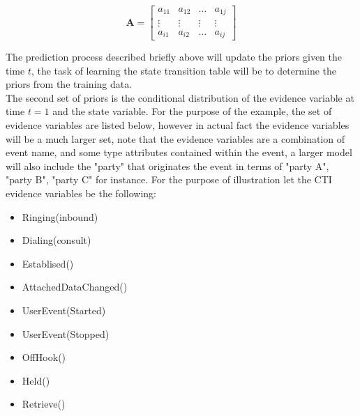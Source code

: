 \documentclass[11pt]{article}
\begin{document}
\begin{equation*}
    \mathbf{A} = \left[
    \begin{array}{cccc}
    a_{11} & a_{12} & \ldots & a_{1j} \\
    \vdots & \vdots & \vdots & \vdots \\
    a_{i1} & a_{i2} & \ldots & a_{ij}
   
    \end{array}
    \right]
\end{equation*}


The prediction process described briefly above will update the priors given the time $t$, the task of learning the state transition table will be to determine the priors from the training data.\\
The second set of priors is the conditional distribution of the  evidence variable at time $t=1$ and the state variable. For the purpose of the example, the set of evidence variables are listed below, however in actual fact the evidence variables will be a much larger set, note that the evidence variables are a combination of event name, and some type attributes contained within the event, a larger model will also include the "party" that originates the event in terms of "party A", "party B", "party C" for instance. For the purpose of illustration let the CTI evidence variables be the following:
\\
\begin{itemize}
\item Ringing(inbound)
\item Dialing(consult)
\item Establised()
\item AttachedDataChanged()
\item UserEvent(Started)
\item UserEvent(Stopped)
\item OffHook()
\item Held()
\item Retrieve()
\end{itemize}
\end{document}
